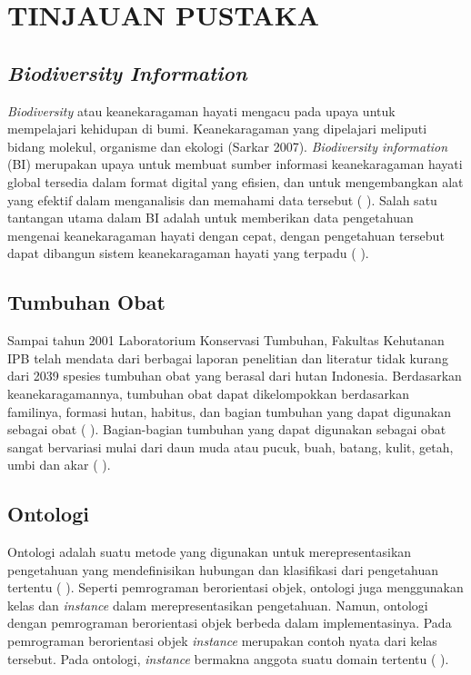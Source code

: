 \section*{TINJAUAN PUSTAKA}

\subsection*{\textit{Biodiversity Information}}

\textit{Biodiversity} atau keanekaragaman hayati mengacu pada upaya untuk mempelajari kehidupan di bumi. Keanekaragaman yang dipelajari meliputi bidang molekul, organisme dan ekologi (Sarkar 2007). \textit{Biodiversity information} (BI) merupakan upaya untuk membuat sumber informasi keanekaragaman hayati global tersedia dalam format digital yang efisien, dan untuk mengembangkan alat yang efektif dalam menganalisis dan memahami data tersebut (\citeauthor{GILLMANE2009} \cite*{GILLMANE2009}).  Salah satu tantangan utama dalam BI adalah untuk memberikan data pengetahuan mengenai keanekaragaman hayati dengan cepat, dengan pengetahuan tersebut dapat dibangun sistem keanekaragaman hayati yang terpadu (\citeauthor{GILLMANE2009} \cite*{GILLMANE2009}).

\subsection*{Tumbuhan Obat}

Sampai tahun 2001 Laboratorium Konservasi Tumbuhan, Fakultas Kehutanan IPB telah mendata dari berbagai laporan penelitian dan literatur tidak kurang dari 2039 spesies tumbuhan obat yang berasal dari hutan Indonesia. Berdasarkan keanekaragamannya, tumbuhan obat dapat dikelompokkan berdasarkan familinya, formasi hutan, habitus, dan bagian tumbuhan yang dapat digunakan sebagai obat (\citeauthor{ZUHUD2008} \cite*{ZUHUD2008}). Bagian-bagian tumbuhan yang dapat digunakan sebagai obat sangat bervariasi mulai dari daun muda atau pucuk, buah, batang, kulit, getah, umbi dan akar (\citeauthor{HAMZARI2008} \cite*{HAMZARI2008}).

\subsection*{Ontologi}

Ontologi adalah suatu metode yang digunakan untuk merepresentasikan pengetahuan yang mendefinisikan hubungan dan klasifikasi dari pengetahuan tertentu (\citeauthor{JEPSEN2010} \cite*{JEPSEN2010}). Seperti pemrograman berorientasi objek, ontologi juga menggunakan kelas dan \textit{instance} dalam merepresentasikan pengetahuan. Namun, ontologi dengan pemrograman berorientasi objek berbeda dalam implementasinya. Pada pemrograman berorientasi objek \textit{instance} merupakan contoh nyata dari kelas tersebut. Pada ontologi, \textit{instance} bermakna anggota suatu domain tertentu (\citeauthor{JEPSEN2010} \cite*{JEPSEN2010}).

